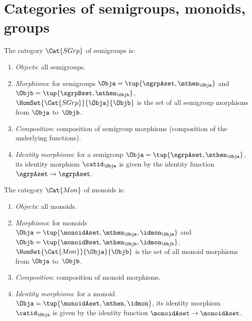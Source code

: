 
\section[Categories of semigroups, monoids, groups]{Categories of semigroups, monoids, groups}
\label{sec:cats-of-semigroups-monoids-groups}


\begin{ctdefinition}
    \label{def:SGrp}
    The category $\Cat{SGrp}$ of semigroups is:
    \begin{enumerate}
        \item \emph{Objects}: all semigroups.
        \item \emph{Morphisms}: for semigroups $\Obja = \tup{\sgrpAset, \mthen_\Obja}$ and $\Objb = \tup{\sgrpBset, \mthen_\Objb}$,  $\HomSet{\Cat{SGrp}}{\Obja}{\Objb}$ is the set of all semigroup morphisms from $\Obja$ to~$\Objb$.
        \item \emph{Composition}: composition of semigroup morphisms (composition of the underlying functions).
        \item \emph{Identity morphisms}: for a semigroup $\Obja = \tup{\sgrpAset, \mthen_\Obja}$, its identity morphism $\catid_\Obja$ is given by the identity function $\sgrpAset \to \sgrpAset$.
    \end{enumerate}
\end{ctdefinition}

\begin{ctdefinition}
    \label{def:Mon}
    The category $\Cat{Mon}$ of monoids is:
    \begin{enumerate}
        \item \emph{Objects}: all monoids.
        \item \emph{Morphisms}: for monoids $\Obja = \tup{\monoidAset, \mthen_\Obja, \idmon_\Obja}$ and $\Objb = \tup{\monoidBset, \mthen_\Objb, \idmon_\Objb}$,  \linebreak $\HomSet{\Cat{Mon}}{\Obja}{\Objb}$ is the set of all monoid morphisms from $\Obja$ to~$\Objb$.
        \item \emph{Composition}: composition of monoid morphisms.
        \item \emph{Identity morphisms}: for a monoid $\Obja = \tup{\monoidAset, \mthen, \idmon}$, its identity morphism $\catid_\Obja$ is given by the identity function $\monoidAset \to \monoidAset$.
    \end{enumerate}
\end{ctdefinition}

